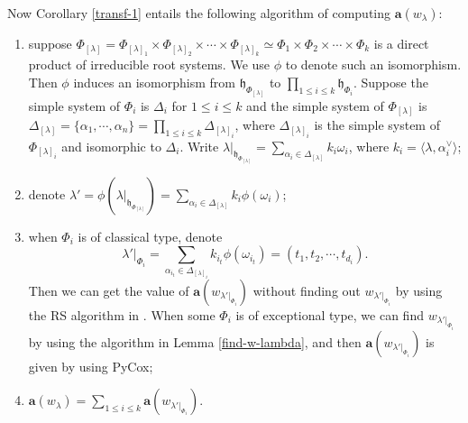 \documentclass[reqno,12pt]{amsart}
\numberwithin{equation}{section}
\theoremstyle{plain}
\newtheorem{Cor}[Thm]{Corollary}
\theoremstyle{definition}
\newcommand{\lam}{\lambda}
\newcommand{\ep}{\varepsilon}
\newcommand{\aff}{ \mathbf{a} }
\newcommand{\lest}{\leqslant}
\renewcommand{\leq}{\leqslant}
\begin{document}

Now Corollary \ref{transf-1} entails the following algorithm of computing $\aff(w_{\lam})$:
\begin{enumerate}
    \item suppose $\Phi_{[\lam]}=\Phi_{[\lambda]_1}\times \Phi_{[\lambda]_2}\times \cdots \times \Phi_{[\lambda]_k}\simeq \Phi_1\times \Phi_2\times \cdots\times \Phi_k$ is a direct product of irreducible root systems. We use $\phi$ to denote such an isomorphism.  Then $\phi$ induces an isomorphism from $\mathfrak{h}_{\Phi_{[\lam]}}$ to $\prod_{1\leq i\leq k} \mathfrak{h}_{\Phi_i}$. Suppose the simple system of $\Phi_{i}$ is $\Delta_i$ for $1\leq i\leq k$ and   the simple system of $\Phi_{[\lam]}$ is $\Delta_{[\lam]}=\{\alpha_1,\cdots,\alpha_n\}=\prod_{1\leq i\leq k}\Delta_{[\lam]_i}$, where $\Delta_{[\lam]_i}$ is the simple system of $\Phi_{[\lambda]_i}$ and isomorphic  to $\Delta_i$.  Write $\lambda|_{\mathfrak{h}_{\Phi_{[\lambda]}}}=\sum_{\alpha_i\in \Delta_{[\lam]}}k_i\omega_i$, where $k_i=\langle \lam, \alpha_i^{\vee}\rangle$;
    \item denote ${\lam}'=\phi(\lam|_{\mathfrak{h}_{\Phi_{[\lambda]}}})=\sum_{\alpha_i\in \Delta_{[\lam]}}k_i\phi(\omega_i)$;
    \item  when $\Phi_i$ is of classical type, denote $${\lam}'|_{\Phi_i}=\sum_{\alpha_{i_t}\in \Delta_{[\lam]_i}}k_{i_t}\phi(\omega_{i_t})=(t_{1},t_{2},\cdots,t_{d_i}).$$ 
    Then we can get the value of $\aff(w_{\lam'|_{{\Phi_i}}})$ without finding out $w_{\lam'|_{{\Phi_i}}}$ by using the RS algorithm in \cite{BXX}. When some $\Phi_i$ is of exceptional type, we can find $w_{\lam'|_{{\Phi_i}}}$ by using the algorithm in Lemma \ref{find-w-lambda}, and then $\aff(w_{\lam'|_{{\Phi_i}}})$ is given by using PyCox;
     \item$\aff(w_{\lam})=\sum_{1\leq i\leq k} \aff(w_{\lam'|_{{\Phi_i}}})$.
\end{enumerate}
\end{document}
